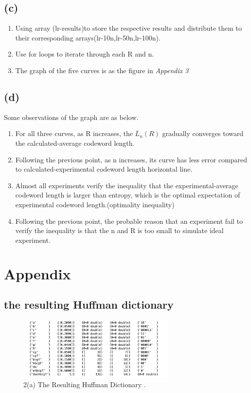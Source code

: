 \documentclass{article}
\begin{document}
\begin{CJK*}{UTF8}{bsmi}
\subsection{(c)}
\begin{enumerate}
    \item Using array (lr-results)to store the respective results and distribute them to their corresponding arrays(lr-10n,lr-50n,lr-100n).
    \item Use for loops to iterate through each R and n.
    \item The graph of the five curves is as the figure in \emph{Appendix 3}
\end{enumerate}
    
\subsection{(d)}
\quad Some observations of the graph are as below.
\begin{enumerate}
    \item For all three curves, as R increases, the $\overline{L}_{n}(R)$ gradually converges toward the calculated-average codeword length.
    \item Following the previous point, as n increases, its curve has less error compared to calculated-experimental codeword length horizontal line. 
    \item Almost all experiments verify the inequality that the experimental-average codeword length is larger than entropy, which is the optimal expectation of experimental codeword length.(optimality inequality) 
    \item Following the previous point, the probable reason that an experiment fail to verify the inequality is that the n and R is too small to simulate ideal experiment.
\end{enumerate}

\section{Appendix}
\subsection{the resulting Huffman dictionary}
\begin{figure}[h]
\centering
\includegraphics[width=0.7\textwidth]{huffdic.png}
\caption{\label{fig:huffdic.png}2(a) The Resulting Huffman Dictionary .}
\end{figure}


\end{CJK*}
\end{document}
